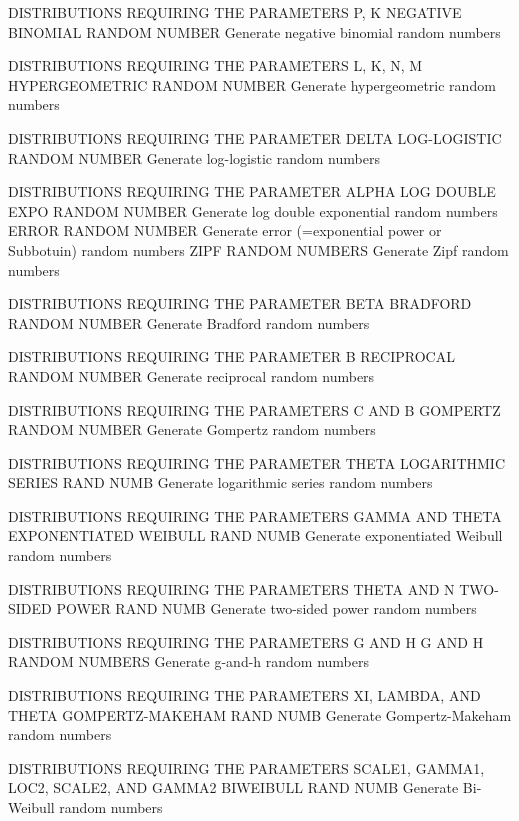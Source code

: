DISTRIBUTIONS REQUIRING THE PARAMETERS P, K
   NEGATIVE BINOMIAL RANDOM NUMBER Generate negative binomial random
                                   numbers
 
DISTRIBUTIONS REQUIRING THE PARAMETERS L, K, N, M
   HYPERGEOMETRIC RANDOM NUMBER    Generate hypergeometric random
                                   numbers

DISTRIBUTIONS REQUIRING THE PARAMETER DELTA
   LOG-LOGISTIC RANDOM NUMBER      Generate log-logistic random
                                   numbers

DISTRIBUTIONS REQUIRING THE PARAMETER ALPHA
   LOG DOUBLE EXPO RANDOM NUMBER   Generate log double exponential
                                   random numbers
   ERROR RANDOM NUMBER             Generate error (=exponential power
                                   or Subbotuin) random numbers
   ZIPF RANDOM NUMBERS             Generate Zipf random numbers

DISTRIBUTIONS REQUIRING THE PARAMETER BETA
   BRADFORD RANDOM NUMBER          Generate Bradford random numbers

DISTRIBUTIONS REQUIRING THE PARAMETER B
   RECIPROCAL RANDOM NUMBER        Generate reciprocal random numbers

DISTRIBUTIONS REQUIRING THE PARAMETERS C AND B
   GOMPERTZ RANDOM NUMBER          Generate Gompertz random numbers

DISTRIBUTIONS REQUIRING THE PARAMETER THETA
   LOGARITHMIC SERIES RAND NUMB    Generate logarithmic series random
                                   numbers

DISTRIBUTIONS REQUIRING THE PARAMETERS GAMMA AND THETA
   EXPONENTIATED WEIBULL RAND NUMB Generate exponentiated Weibull
                                   random numbers

DISTRIBUTIONS REQUIRING THE PARAMETERS THETA AND N
   TWO-SIDED POWER RAND NUMB       Generate two-sided power
                                   random numbers

DISTRIBUTIONS REQUIRING THE PARAMETERS G AND H
   G AND H RANDOM NUMBERS          Generate g-and-h random numbers

DISTRIBUTIONS REQUIRING THE PARAMETERS XI, LAMBDA, AND THETA
   GOMPERTZ-MAKEHAM RAND NUMB      Generate Gompertz-Makeham random
                                   numbers

DISTRIBUTIONS REQUIRING THE PARAMETERS SCALE1, GAMMA1, LOC2, SCALE2,
   AND GAMMA2
   BIWEIBULL RAND NUMB             Generate Bi-Weibull random numbers

